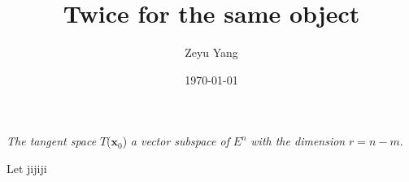 \documentclass[titlepage,a4paper,12pt]{article}
\theoremstyle{nonumberplain}
\newtheorem{Proof}{\hskip 2em Proof}
\begin{document}
    \title{\textbf{Twice for the same object}}
    \author{Zeyu Yang}
    \date{\today}
    \maketitle

    \emph{The tangent space} $T$($\textbf{x}_0$) \emph{a vector subspace of} $E^n$ \emph{with the dimension} $r=n-m$.
\begin{Proof}
Let jijiji
\end{Proof}
\end{document}
